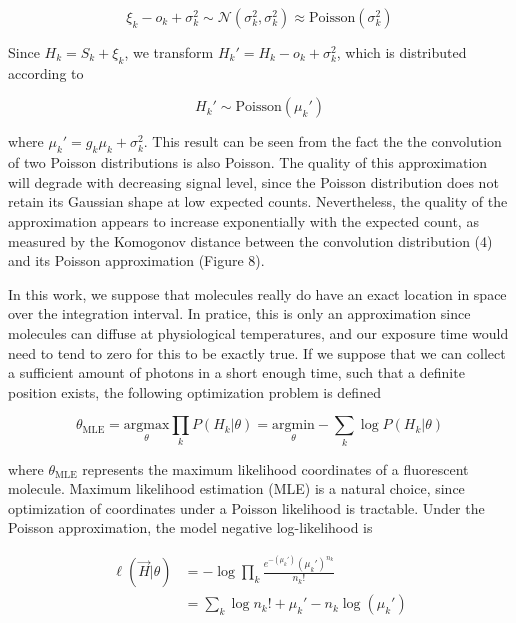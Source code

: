\documentclass{ucetd}
\begin{document}
\begin{equation*}
\xi_{k} - o_{k} + \sigma_{k}^{2} \sim \mathcal{N}(\sigma_{k}^{2},\sigma_{k}^{2}) \approx \mathrm{Poisson}(\sigma_{k}^{2})
\end{equation*}

Since $H_{k} = S_{k} + \xi_{k}$, we transform $H_{k}' = H_{k} - o_{k} + \sigma_{k}^{2}$, which is distributed according to 

\begin{equation*}
H_{k}' \sim \mathrm{Poisson}(\mu_{k}')
\end{equation*}

where $\mu_{k}' = g_{k}\mu_{k} + \sigma_{k}^{2}$. This result can be seen from the fact the the convolution of two Poisson distributions is also Poisson. The quality of this approximation will degrade with decreasing signal level, since the Poisson distribution does not retain its Gaussian shape at low expected counts. Nevertheless, the quality of the approximation appears to increase exponentially with the expected count, as measured by the Komogonov distance between the convolution distribution (4) and its Poisson approximation (Figure 8).

In this work, we suppose that molecules really do have an exact location in space over the integration interval. In pratice, this is only an approximation since molecules can diffuse at physiological temperatures, and our exposure time would need to tend to zero for this to be exactly true. If we suppose that we can collect a sufficient amount of photons in a short enough time, such that a definite position exists, the following optimization problem is defined

\begin{equation*}
\theta_{\mathrm{MLE}} = \underset{\theta}{\mathrm{argmax}}\prod_{k}P(H_{k}|\theta)= \underset{\theta}{\mathrm{argmin}}-\sum_{k}\log P(H_{k}|\theta)
\end{equation*}


where $\theta_{\mathrm{MLE}}$ represents the maximum likelihood coordinates of a fluorescent molecule. Maximum likelihood estimation (MLE) is a natural choice, since optimization of coordinates under a Poisson likelihood is tractable. Under the Poisson approximation, the model negative log-likelihood is

\begin{align}
\ell(\vec{H}|\theta) &= -\log \prod_{k} \frac{e^{-\left(\mu_{k}'\right)}\left(\mu_{k}'\right)^{n_{k}}}{n_{k}!}\\
&= \sum_{k}  \log n_{k}! + \mu_{k}' - n_{k}\log\left(\mu_{k}'\right)
\end{align}
\end{document}

